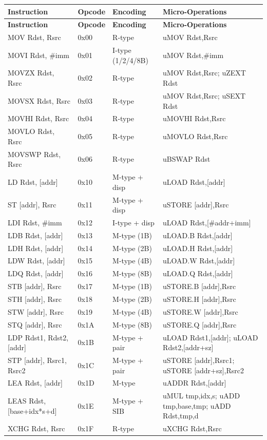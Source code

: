 \documentclass[12pt]{article}
\begin{document}
\begin{longtable}{@{}L{3.5cm}L{1.5cm}L{2cm}L{4.5cm}@{}}
\toprule
\textbf{Instruction} & \textbf{Opcode} & \textbf{Encoding} & \textbf{Micro-Operations} \\ \midrule
\endfirsthead
\toprule
\textbf{Instruction} & \textbf{Opcode} & \textbf{Encoding} & \textbf{Micro-Operations} \\ \midrule
\endhead
MOV Rdst, Rsrc & 0x00 & R-type & uMOV Rdst,Rsrc \\
MOVI Rdst, \#imm & 0x01 & I-type (1/2/4/8B) & uMOV Rdst,\#imm \\
MOVZX Rdst, Rsrc & 0x02 & R-type & uMOV Rdst,Rsrc; uZEXT Rdst \\
MOVSX Rdst, Rsrc & 0x03 & R-type & uMOV Rdst,Rsrc; uSEXT Rdst \\
MOVHI Rdst, Rsrc & 0x04 & R-type & uMOVHI Rdst,Rsrc \\
MOVLO Rdst, Rsrc & 0x05 & R-type & uMOVLO Rdst,Rsrc \\
MOVSWP Rdst, Rsrc & 0x06 & R-type & uBSWAP Rdst \\
LD Rdst, [addr] & 0x10 & M-type + disp & uLOAD Rdst,[addr] \\
ST [addr], Rsrc & 0x11 & M-type + disp & uSTORE [addr],Rsrc \\
LDI Rdst, \#imm & 0x12 & I-type + disp & uLOAD Rdst,[\#addr+imm] \\
LDB Rdst, [addr] & 0x13 & M-type (1B) & uLOAD.B Rdst,[addr] \\
LDH Rdst, [addr] & 0x14 & M-type (2B) & uLOAD.H Rdst,[addr] \\
LDW Rdst, [addr] & 0x15 & M-type (4B) & uLOAD.W Rdst,[addr] \\
LDQ Rdst, [addr] & 0x16 & M-type (8B) & uLOAD.Q Rdst,[addr] \\
STB [addr], Rsrc & 0x17 & M-type (1B) & uSTORE.B [addr],Rsrc \\
STH [addr], Rsrc & 0x18 & M-type (2B) & uSTORE.H [addr],Rsrc \\
STW [addr], Rsrc & 0x19 & M-type (4B) & uSTORE.W [addr],Rsrc \\
STQ [addr], Rsrc & 0x1A & M-type (8B) & uSTORE.Q [addr],Rsrc \\
LDP Rdst1, Rdst2, [addr] & 0x1B & M-type + pair & uLOAD Rdst1,[addr]; uLOAD Rdst2,[addr+sz] \\
STP [addr], Rsrc1, Rsrc2 & 0x1C & M-type + pair & uSTORE [addr],Rsrc1; uSTORE [addr+sz],Rsrc2 \\
LEA Rdst, [addr] & 0x1D & M-type & uADDR Rdst,[addr] \\
LEAS Rdst, [base+idx*s+d] & 0x1E & M-type + SIB & uMUL tmp,idx,s; uADD tmp,base,tmp; uADD Rdst,tmp,d \\
XCHG Rdst, Rsrc & 0x1F & R-type & uXCHG Rdst,Rsrc \\ \bottomrule
\end{longtable}
\end{document}
